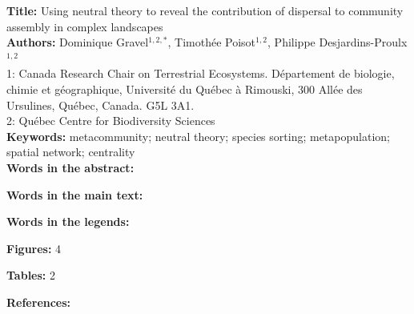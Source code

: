 \documentclass[12pt]{article}
\begin{document}
\linenumbers 
\modulolinenumbers[1]

\textbf{Title:}  Using neutral theory to reveal the contribution of dispersal to community assembly in complex landscapes\\

\textbf{Authors:}  Dominique Gravel$^{1,2,*}$, Timoth\'ee Poisot$^{1,2}$, Philippe Desjardins-Proulx$^{1,2}$\\

1: Canada Research Chair on Terrestrial Ecosystems. D\'epartement de biologie, chimie et g\'eographique, Universit\'e du Qu\'ebec \`a Rimouski, 300 All\'ee des Ursulines, Qu\'ebec, Canada. G5L 3A1.\\

2: Qu\'ebec Centre for Biodiversity Sciences\\

\textbf{Keywords:} metacommunity; neutral theory; species sorting; metapopulation; spatial network; centrality \\

\textbf{Words in the abstract:}      

\textbf{Words in the main text:}    

\textbf{Words in the legends:}    

\textbf{Figures:} 4 

\textbf{Tables:} 2                    

\textbf{References:}             

\newpage
\doublespacing

\end{document}
